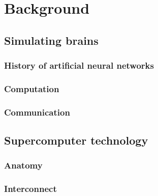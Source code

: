 \chapter{Background}
	
	\section{Simulating brains}
		\label{sec:simulating-brains}
		
		
		\subsection{History of artificial neural networks}
			
		
		\subsection{Computation}
			
		
		\subsection{Communication}
			
	
	
	\section{Supercomputer technology}
		\label{sec:supercomputers}
		
		
		\subsection{Anatomy}
			
		
		\subsection{Interconnect}
			
